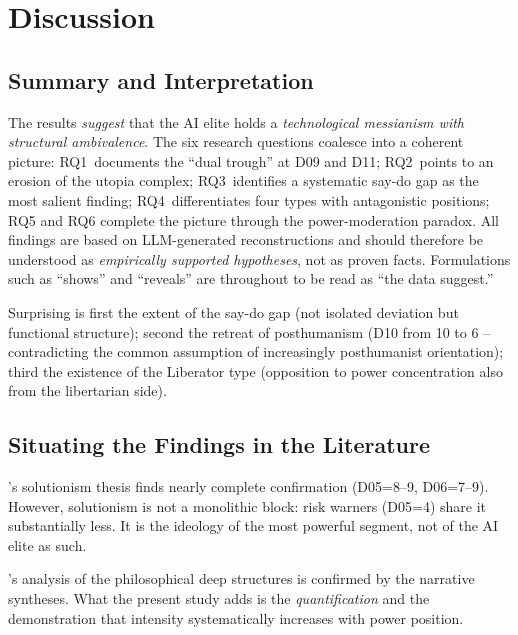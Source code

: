 \documentclass[12pt,a4paper]{article}
\begin{document}
\section{Discussion}
\label{sec:diskussion}

\subsection{Summary and Interpretation}
\label{sec:diskussion:zusammenfassung}

The results \emph{suggest} that the AI elite holds a \emph{technological messianism with structural ambivalence}. The six research questions coalesce into a coherent picture: RQ1~documents the ``dual trough'' at D09 and D11; RQ2~points to an erosion of the utopia complex; RQ3~identifies a systematic say-do gap as the most salient finding; RQ4~differentiates four types with antagonistic positions; RQ5 and RQ6 complete the picture through the power-moderation paradox. All findings are based on LLM-generated reconstructions and should therefore be understood as \emph{empirically supported hypotheses}, not as proven facts. Formulations such as ``shows'' and ``reveals'' are throughout to be read as ``the data suggest.''

Surprising is first the extent of the say-do gap (not isolated deviation but functional structure); second the retreat of posthumanism (D10 from 10 to 6 -- contradicting the common assumption of increasingly posthumanist orientation); third the existence of the Liberator type (opposition to power concentration also from the libertarian side).


\subsection{Situating the Findings in the Literature}
\label{sec:diskussion:einordnung}

\citeauthor{Morozov2013}'s solutionism thesis finds nearly complete confirmation (D05=8--9, D06=7--9). However, solutionism is not a monolithic block: risk warners (D05=4) share it substantially less. It is the ideology of the most powerful segment, not of the AI elite as such.

\citeauthor{Daub2020}'s analysis of the philosophical deep structures is confirmed by the narrative syntheses. What the present study adds is the \emph{quantification} and the demonstration that intensity systematically increases with power position.
\end{document}
